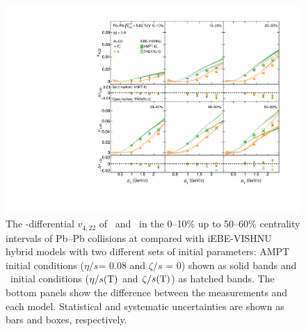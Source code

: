  \begin{figure}[h]
\begin{center}
\includegraphics[scale=0.73]{figures/model/TrentoAndAMPT_v422_gap00_LambdaK0s.pdf}
\end{center}
\caption{The \pT-differential $v_{4,22}$ of \Ks~and \lambdas~in the 0--10\% up to 50--60\% centrality intervals of Pb--Pb collisions at \sNN compared with iEBE-VISHNU hybrid models with two different sets of initial parameters: AMPT initial conditions ($\eta/s$= 0.08 and $\zeta/s$ = 0) shown as solid bands and \trento~initial conditions ($\eta/s({\rm T})$ and $\zeta/s({\rm T})$) as hatched bands. The bottom panels show the difference between the measurements and each model. Statistical and systematic uncertainties are shown as bars and boxes, respectively.}
\label{v422_model_KL}
\end{figure}


